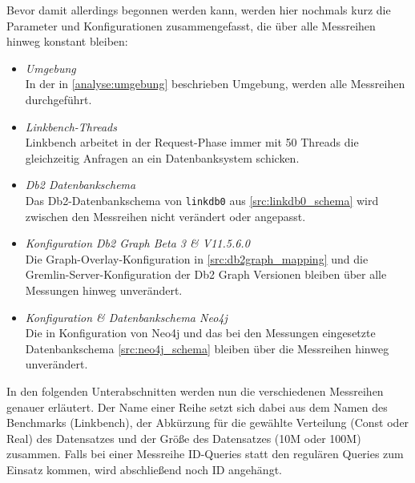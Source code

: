 Bevor damit allerdings begonnen werden kann, werden hier nochmals kurz die Parameter und Konfigurationen zusammengefasst, die über alle Messreihen hinweg konstant bleiben:
\begin{itemize}
    \item \textit{Umgebung}\\
    In der in \autoref{analyse:umgebung} beschrieben Umgebung, werden alle Messreihen durchgeführt. 
    \item \textit{Linkbench-Threads}\\
    Linkbench arbeitet in der Request-Phase immer mit 50 Threads die gleichzeitig Anfragen an ein Datenbanksystem schicken.
    \item \textit{Db2 Datenbankschema}\\
    Das Db2-Datenbankschema von \texttt{linkdb0} aus \autoref{src:linkdb0_schema} wird zwischen den Messreihen nicht verändert oder angepasst. 
    \item \textit{Konfiguration Db2 Graph Beta 3 \& V11.5.6.0}\\
    Die Graph-Overlay-Konfiguration in \autoref{src:db2graph_mapping} und die Gremlin-Server-Konfiguration der Db2 Graph Versionen bleiben über alle Messungen hinweg unverändert.
    \item \textit{Konfiguration \& Datenbankschema Neo4j}\\
    Die in Konfiguration von Neo4j und das bei den Messungen eingesetzte Datenbankschema \autoref{src:neo4j_schema} bleiben über die Messreihen hinweg unverändert. 
\end{itemize}

In den folgenden Unterabschnitten werden nun die verschiedenen Messreihen genauer erläutert. Der Name einer Reihe setzt sich dabei aus dem Namen des Benchmarks (Linkbench), der Abkürzung für die gewählte Verteilung (Const oder Real) des Datensatzes und der Größe des Datensatzes (10M oder 100M) zusammen. Falls bei einer Messreihe ID-Queries statt den regulären Queries zum Einsatz kommen, wird abschließend noch ID angehängt.

